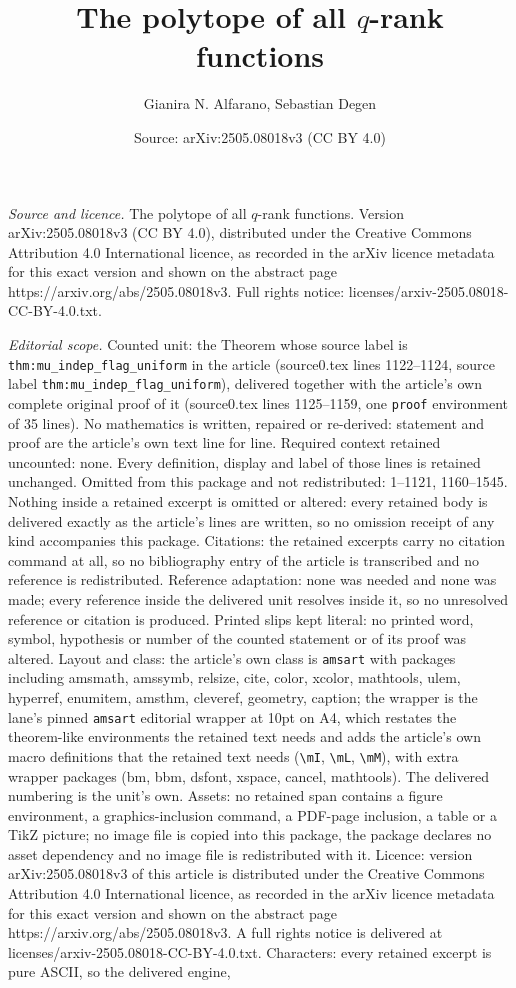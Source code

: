\documentclass[10pt,a4paper]{amsart}
\title[The polytope of all $q$-rank functions]{The polytope of all $q$-rank functions}
\author{Gianira N. Alfarano, Sebastian Degen}
\date{Source: arXiv:2505.08018v3 (CC BY 4.0)}
\begin{document}
\maketitle

\noindent\emph{Source and licence.} The polytope of all $q$-rank functions. Version arXiv:2505.08018v3 (CC BY 4.0), distributed under the Creative Commons Attribution 4.0 International licence, as recorded in the arXiv licence metadata for this exact version and shown on the abstract page https://arxiv.org/abs/2505.08018v3. Full rights notice: licenses/arxiv-2505.08018-CC-BY-4.0.txt.\par\smallskip

\noindent\textit{Editorial scope.} Counted unit: the Theorem whose source label is \texttt{thm:mu\_indep\_flag\_uniform} in the article (source0.tex lines 1122--1124, source label \texttt{thm:mu\_indep\_flag\_uniform}), delivered together with the article's own complete original proof of it (source0.tex lines 1125--1159, one \texttt{proof} environment of 35 lines). No mathematics is written, repaired or re-derived: statement and proof are the article's own text line for line. Required context retained uncounted: none. Every definition, display and label of those lines is retained unchanged. Omitted from this package and not redistributed: 1--1121, 1160--1545. Nothing inside a retained excerpt is omitted or altered: every retained body is delivered exactly as the article's lines are written, so no omission receipt of any kind accompanies this package. Citations: the retained excerpts carry no citation command at all, so no bibliography entry of the article is transcribed and no reference is redistributed. Reference adaptation: none was needed and none was made; every reference inside the delivered unit resolves inside it, so no unresolved reference or citation is produced. Printed slips kept literal: no printed word, symbol, hypothesis or number of the counted statement or of its proof was altered. Layout and class: the article's own class is \texttt{amsart} with packages including amsmath, amssymb, relsize, cite, color, xcolor, mathtools, ulem, hyperref, enumitem, amsthm, cleveref, geometry, caption; the wrapper is the lane's pinned \texttt{amsart} editorial wrapper at 10pt on A4, which restates the theorem-like environments the retained text needs and adds the article's own macro definitions that the retained text needs (\texttt{\textbackslash mI}, \texttt{\textbackslash mL}, \texttt{\textbackslash mM}), with extra wrapper packages (bm, bbm, dsfont, xspace, cancel, mathtools). The delivered numbering is the unit's own. Assets: no retained span contains a figure environment, a graphics-inclusion command, a PDF-page inclusion, a table or a TikZ picture; no image file is copied into this package, the package declares no asset dependency and no image file is redistributed with it. Licence: version arXiv:2505.08018v3 of this article is distributed under the Creative Commons Attribution 4.0 International licence, as recorded in the arXiv licence metadata for this exact version and shown on the abstract page https://arxiv.org/abs/2505.08018v3. A full rights notice is delivered at licenses/arxiv-2505.08018-CC-BY-4.0.txt. Characters: every retained excerpt is pure ASCII, so the delivered engine, 
\end{document}
